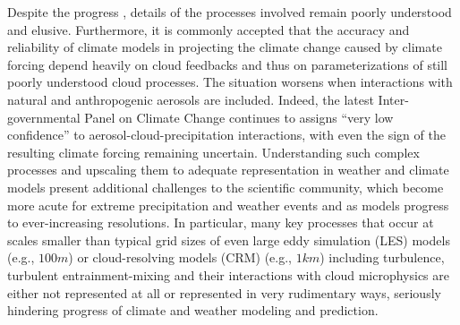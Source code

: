\documentclass[draft,linenumbers]{AGUJournal}
\begin{document}
Despite the progress \citep[see][for recent reviews]{Devenish2012, GrabowskiWang2013}, details of the processes involved remain poorly understood and elusive. Furthermore, it is commonly accepted that the accuracy and reliability of climate models in projecting the climate change caused by climate forcing depend heavily on cloud feedbacks and thus on parameterizations of still poorly understood cloud processes. The situation worsens when interactions with natural and anthropogenic aerosols are included. Indeed, the latest Inter-governmental Panel on Climate Change continues to assigns ``very low confidence'' to aerosol-cloud-precipitation interactions, with even the sign of the resulting climate forcing remaining uncertain. Understanding such complex processes and upscaling them to adequate representation in weather and climate models present additional challenges to the scientific community, which become more acute for extreme precipitation and weather events and as models progress to ever-increasing resolutions. In particular, many key processes that occur at scales smaller than typical grid sizes of even large eddy simulation (LES) models (e.g., $100m$) or cloud-resolving models (CRM) (e.g., $1km$) including turbulence, turbulent entrainment-mixing and their interactions with cloud microphysics are either not represented at all or represented in very rudimentary ways, seriously hindering progress of climate and weather modeling and prediction.
\end{document}
